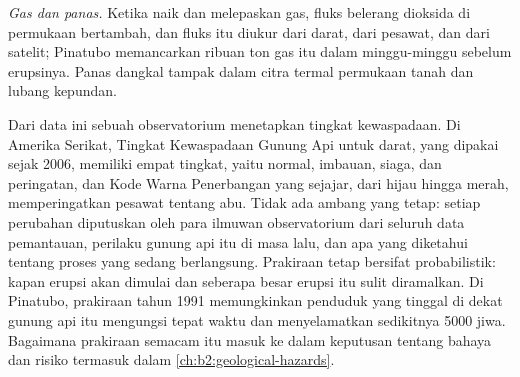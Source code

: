 \begin{omfigure}
\centering
{}
\par{}
\end{omfigure}

\emph{Gas dan panas.} Ketika  naik dan melepaskan gas, fluks belerang dioksida di
permukaan bertambah, dan fluks itu diukur dari darat, dari pesawat, dan dari
satelit; Pinatubo memancarkan ribuan ton gas itu dalam minggu-minggu sebelum erupsinya.
Panas  dangkal tampak dalam citra termal permukaan tanah dan lubang kepundan.

Dari data ini sebuah observatorium menetapkan tingkat kewaspadaan. Di Amerika Serikat,
Tingkat Kewaspadaan Gunung Api untuk darat, yang dipakai sejak 2006, memiliki empat tingkat, yaitu normal,
imbauan, siaga, dan peringatan, dan Kode Warna Penerbangan yang sejajar, dari hijau hingga merah,
memperingatkan pesawat tentang abu. Tidak ada ambang yang tetap: setiap perubahan diputuskan oleh
para ilmuwan observatorium dari seluruh data pemantauan, perilaku gunung api itu di masa lalu,
dan apa yang diketahui tentang proses yang sedang berlangsung. Prakiraan tetap
bersifat probabilistik: kapan erupsi akan dimulai dan seberapa besar erupsi itu sulit
diramalkan. Di Pinatubo, prakiraan tahun 1991 memungkinkan penduduk yang tinggal di dekat gunung
api itu mengungsi tepat waktu dan menyelamatkan sedikitnya \num{5000} jiwa. Bagaimana prakiraan semacam itu
masuk ke dalam keputusan tentang bahaya dan risiko termasuk dalam \cref{ch:b2:geological-hazards}.

